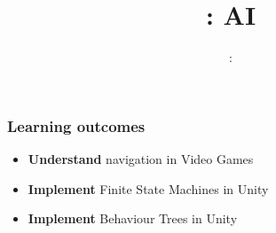 \usepackage{../../beamerthemeFalmouthGamesAcademy}
\usepackage{multimedia}
\graphicspath{ {../../} }


\usepackage[normalem]{ulem}
\usepackage{wasysym}

\usepackage{pdfpages}

\usetikzlibrary{arrows,automata}

\usepackage{qtree}





\title{\sessionnumber: AI}
\subtitle{\modulecode: \moduletitle}

\frame{\titlepage} 

\begin{frame}
	\frametitle{Learning outcomes}
	\begin{itemize}
		\item \textbf{Understand} navigation in Video Games
		\item \textbf{Implement} Finite State Machines in Unity
		\item \textbf{Implement} Behaviour Trees in Unity
	\end{itemize}
\end{frame}






